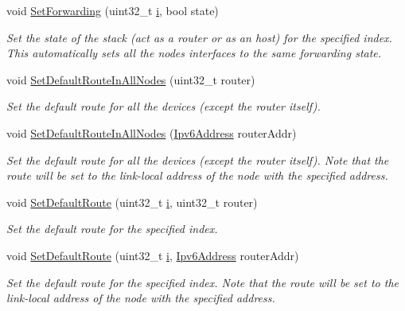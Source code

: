 \begin{DoxyCompactItemize}
void \hyperlink{classns3_1_1Ipv6InterfaceContainer_a080aad6f43a52c6478053b237e5e6979}{Set\+Forwarding} (uint32\+\_\+t \hyperlink{lte__uplink__power__control_8m_a6f6ccfcf58b31cb6412107d9d5281426}{i}, bool state)
\begin{DoxyCompactList}\small\item\em Set the state of the stack (act as a router or as an host) for the specified index. This automatically sets all the node\textquotesingle{}s interfaces to the same forwarding state. \end{DoxyCompactList}\item 
void \hyperlink{classns3_1_1Ipv6InterfaceContainer_a3fb0cfdcb3780bc624b10a04e58ffbd0}{Set\+Default\+Route\+In\+All\+Nodes} (uint32\+\_\+t router)
\begin{DoxyCompactList}\small\item\em Set the default route for all the devices (except the router itself). \end{DoxyCompactList}\item 
void \hyperlink{classns3_1_1Ipv6InterfaceContainer_a937b4894788e779b458f58ba3cd97409}{Set\+Default\+Route\+In\+All\+Nodes} (\hyperlink{classns3_1_1Ipv6Address}{Ipv6\+Address} router\+Addr)
\begin{DoxyCompactList}\small\item\em Set the default route for all the devices (except the router itself). Note that the route will be set to the link-\/local address of the node with the specified address. \end{DoxyCompactList}\item 
void \hyperlink{classns3_1_1Ipv6InterfaceContainer_a51c8dcf0566530d9e30788fd7ac6486c}{Set\+Default\+Route} (uint32\+\_\+t \hyperlink{lte__uplink__power__control_8m_a6f6ccfcf58b31cb6412107d9d5281426}{i}, uint32\+\_\+t router)
\begin{DoxyCompactList}\small\item\em Set the default route for the specified index. \end{DoxyCompactList}\item 
void \hyperlink{classns3_1_1Ipv6InterfaceContainer_a4e9c1b6b4191b318c1a64f7b3a7ef7f6}{Set\+Default\+Route} (uint32\+\_\+t \hyperlink{lte__uplink__power__control_8m_a6f6ccfcf58b31cb6412107d9d5281426}{i}, \hyperlink{classns3_1_1Ipv6Address}{Ipv6\+Address} router\+Addr)
\begin{DoxyCompactList}\small\item\em Set the default route for the specified index. Note that the route will be set to the link-\/local address of the node with the specified address. \end{DoxyCompactList}\end{DoxyCompactItemize}
